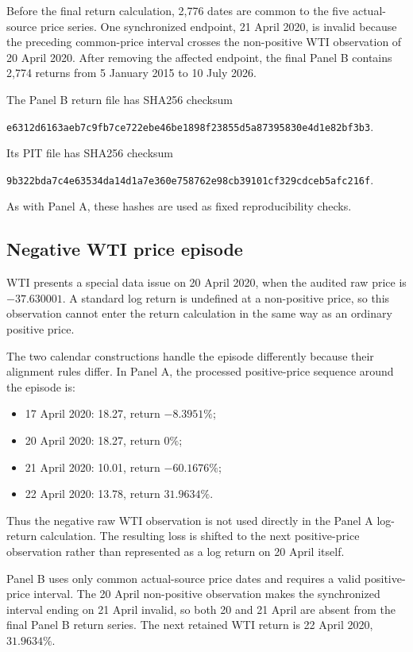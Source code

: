 Before the final return calculation, 2,776 dates are common to the five actual-source price series. One synchronized endpoint, 21 April 2020, is invalid because the preceding common-price interval crosses the non-positive WTI observation of 20 April 2020. After removing the affected endpoint, the final Panel B contains 2,774 returns from 5 January 2015 to 10 July 2026.

The Panel B return file has SHA256 checksum

\texttt{e6312d6163aeb7c9fb7ce722ebe46be1898f23855d5a87395830e4d1e82bf3b3}.

Its PIT file has SHA256 checksum

\texttt{9b322bda7c4e63534da14d1a7e360e758762e98cb39101cf329cdceb5afc216f}.

As with Panel A, these hashes are used as fixed reproducibility checks.

\subsection{Negative WTI price episode}

WTI presents a special data issue on 20 April 2020, when the audited raw price is \(-37.630001\). A standard log return is undefined at a non-positive price, so this observation cannot enter the return calculation in the same way as an ordinary positive price.

The two calendar constructions handle the episode differently because their alignment rules differ. In Panel A, the processed positive-price sequence around the episode is:

\begin{itemize}
\item 17 April 2020: 18.27, return \(-8.3951\%\);
\item 20 April 2020: 18.27, return \(0\%\);
\item 21 April 2020: 10.01, return \(-60.1676\%\);
\item 22 April 2020: 13.78, return \(31.9634\%\).

\end{itemize}
Thus the negative raw WTI observation is not used directly in the Panel A log-return calculation. The resulting loss is shifted to the next positive-price observation rather than represented as a log return on 20 April itself.

Panel B uses only common actual-source price dates and requires a valid positive-price interval. The 20 April non-positive observation makes the synchronized interval ending on 21 April invalid, so both 20 and 21 April are absent from the final Panel B return series. The next retained WTI return is 22 April 2020, \(31.9634\%\).

